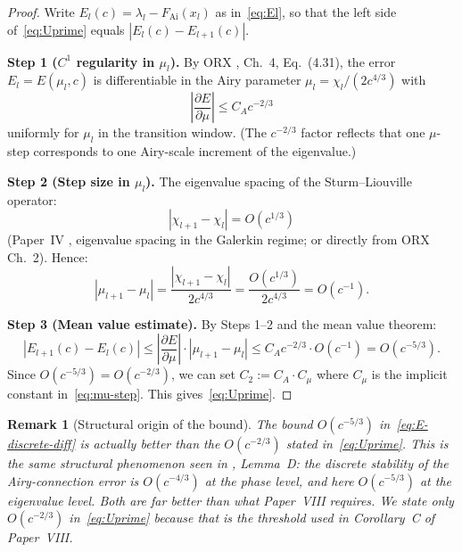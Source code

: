 \documentclass[12pt]{amsart}
\newtheorem{remark}[theorem]{Remark}
\newcommand{\FAi}{F_{\mathrm{Ai}}}
\begin{document}
\begin{proof}
Write $E_l(c) = \lambda_l - \FAi(x_l)$ as in~\eqref{eq:El},
so that the left side of~\eqref{eq:Uprime} equals
$|E_l(c) - E_{l+1}(c)|$.

\textbf{Step 1 ($C^1$ regularity in $\mu_l$).}
By ORX \cite{OsipovRokhlinXiao}, Ch.~4, Eq.~(4.31),
the error $E_l = E(\mu_l, c)$ is differentiable in
the Airy parameter $\mu_l = \chi_l/(2c^{4/3})$
with
\[
  \left|\frac{\partial E}{\partial \mu}\right| \le C_A c^{-2/3}
\]
uniformly for $\mu_l$ in the transition window.
(The $c^{-2/3}$ factor reflects that one $\mu$-step
corresponds to one Airy-scale increment of the eigenvalue.)

\textbf{Step 2 (Step size in $\mu_l$).}
The eigenvalue spacing of the Sturm--Liouville operator:
\[
  |\chi_{l+1} - \chi_l| = O(c^{1/3})
\]
(Paper~IV \cite{paperIV}, eigenvalue spacing in the
Galerkin regime; or directly from ORX Ch.~2).
Hence:
\begin{equation}\label{eq:mu-step}
  |\mu_{l+1} - \mu_l|
  = \frac{|\chi_{l+1} - \chi_l|}{2c^{4/3}}
  = \frac{O(c^{1/3})}{2c^{4/3}}
  = O(c^{-1}).
\end{equation}

\textbf{Step 3 (Mean value estimate).}
By Steps 1--2 and the mean value theorem:
\begin{equation}\label{eq:E-discrete-diff}
  |E_{l+1}(c) - E_l(c)|
  \le \left|\frac{\partial E}{\partial \mu}\right|
       \cdot |\mu_{l+1} - \mu_l|
  \le C_A c^{-2/3} \cdot O(c^{-1})
  = O(c^{-5/3}).
\end{equation}
Since $O(c^{-5/3}) = O(c^{-2/3})$,
we can set $C_2 := C_A \cdot C_\mu$ where
$C_\mu$ is the implicit constant in~\eqref{eq:mu-step}.
This gives~\eqref{eq:Uprime}.
\end{proof}

\begin{remark}[Structural origin of the bound]
The bound $O(c^{-5/3})$ in~\eqref{eq:E-discrete-diff}
is actually \emph{better} than the $O(c^{-2/3})$ stated
in~\eqref{eq:Uprime}.
This is the same structural phenomenon seen in
\cite{PhaseNondeg}, Lemma~D: the discrete stability of the
Airy-connection error is $O(c^{-4/3})$ at the phase level,
and here $O(c^{-5/3})$ at the eigenvalue level.
Both are far better than what Paper~VIII requires.
We state only $O(c^{-2/3})$ in~\eqref{eq:Uprime}
because that is the threshold used in Corollary~C
of Paper~VIII.
\end{remark}

\end{document}
